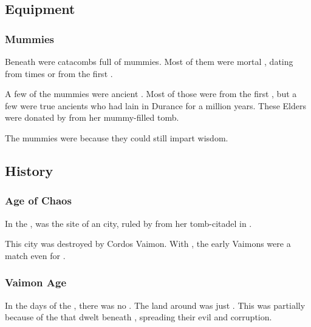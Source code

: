 \subsection{Equipment}





\subsubsection{Mummies}
Beneath \Yormis were catacombs full of mummies. 
Most of them were mortal \scathae, dating from \Ortaican times or from the first \Yormis. 

A few of the mummies were ancient .
Most of those were from the first \Yormis, but a few were true ancients who had lain in Durance for a million years. 
These Elders were donated by \Thessulax from her mummy-filled tomb. 

The mummies were  because they could still impart wisdom. 









\subsection{History}





\subsubsection{Age of Chaos}
In the , \Yormis was the site of an \ophidian city, ruled by  from her tomb-citadel in \KaiLeng.

This city was destroyed by Cordos Vaimon. 
With , the early Vaimons were a match even for \ophidians. 





\subsubsection{Vaimon Age}
In the days of the \VaimonCaliphate, there was no \Yormis. 
The land around  was just \wylde. 
This was partially because of the \xss that dwelt beneath \Shrun, spreading their evil and corruption. 





